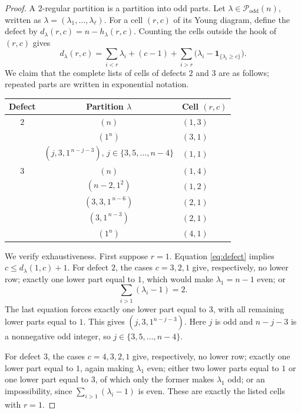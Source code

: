 \documentclass[11pt]{amsart}
\theoremstyle{remark}
\newcommand{\Podd}{\mathcal P_{\mathrm{odd}}}
\newcommand{\ind}{\mathbf 1}
\begin{document}
\begin{proof}
A $2$-regular partition is a partition into odd parts.  Let
$\lambda\in\Podd(n)$, written as
$\lambda=(\lambda_1,\ldots,\lambda_\ell)$.  For a cell $(r,c)$ of its
Young diagram, define the defect by
$d_\lambda(r,c)=n-h_\lambda(r,c)$.  Counting the cells outside the hook
of $(r,c)$ gives
\begin{equation}\label{eq:defect}
 d_\lambda(r,c)
 =\sum_{i<r}\lambda_i+(c-1)
  +\sum_{i>r}\bigl(\lambda_i-\ind_{\{\lambda_i\ge c\}}\bigr).
\end{equation}
We claim that the complete lists of cells of defects $2$ and $3$ are as
follows; repeated parts are written in exponential notation.
\begin{center}
\begin{tabular}{ccl}
\toprule
Defect & Partition $\lambda$ & Cell $(r,c)$ \\
\midrule
$2$ & $(n)$ & $(1,3)$ \\
    & $(1^n)$ & $(3,1)$ \\
    & $(j,3,1^{\,n-j-3})$, $j\in\{3,5,\ldots,n-4\}$ & $(1,1)$ \\
\midrule
$3$ & $(n)$ & $(1,4)$ \\
    & $(n-2,1^2)$ & $(1,2)$ \\
    & $(3,3,1^{\,n-6})$ & $(2,1)$ \\
    & $(3,1^{\,n-3})$ & $(2,1)$ \\
    & $(1^n)$ & $(4,1)$ \\
\bottomrule
\end{tabular}
\end{center}

We verify exhaustiveness.  First suppose $r=1$.  Equation
\eqref{eq:defect} implies $c\le d_\lambda(1,c)+1$.  For defect $2$, the
cases $c=3,2,1$ give, respectively, no lower row; exactly one lower part
equal to $1$, which would make $\lambda_1=n-1$ even; or
\[
 \sum_{i>1}(\lambda_i-1)=2.
\]
The last equation forces exactly one lower part equal to $3$, with all
remaining lower parts equal to $1$.  This gives $(j,3,1^{n-j-3})$.
Here $j$ is odd and $n-j-3$ is a nonnegative odd integer, so
$j\in\{3,5,\ldots,n-4\}$.

For defect $3$, the cases $c=4,3,2,1$ give, respectively, no lower row;
exactly one lower part equal to $1$, again making $\lambda_1$ even;
either two lower parts equal to $1$ or one lower part equal to $3$, of
which only the former makes $\lambda_1$ odd; or an impossibility, since
$\sum_{i>1}(\lambda_i-1)$ is even.  These are exactly the listed cells
with $r=1$.


\end{proof}
\end{document}
